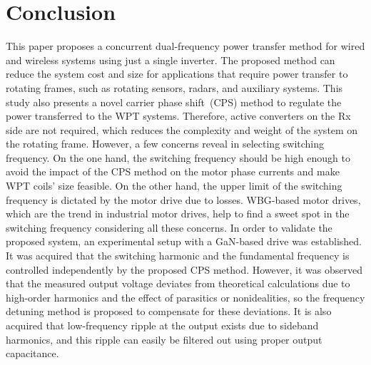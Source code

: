 \documentclass[journal]{IEEEtran}
\begin{document}
\section{Conclusion}
This paper proposes a concurrent dual-frequency power transfer method for wired and wireless systems using just a single inverter.
The proposed method can reduce the system cost and size for applications that require power transfer to rotating frames, such as rotating sensors, radars, and auxiliary systems.
This study also presents a novel carrier phase shift~(CPS) method to regulate the power transferred to the WPT systems.
Therefore, active converters on the Rx side are not required, which reduces the complexity and weight of the system on the rotating frame.
However, a few concerns reveal in selecting switching frequency. 
On the one hand, the switching frequency should be high enough to avoid the impact of the CPS method on the motor phase currents and make WPT coils' size feasible. On the other hand, the upper limit of the switching frequency is dictated by the motor drive due to losses. 
WBG-based motor drives, which are the trend in industrial motor drives,  help to find a sweet spot in the switching frequency considering all these concerns.
In order to validate the proposed system, an experimental setup with a GaN-based drive was established.  
It was acquired that the switching harmonic and the fundamental
frequency is controlled independently by the proposed CPS method.
However, it was observed that the measured output voltage deviates from theoretical calculations due to high-order harmonics and the effect of parasitics or nonidealities, so the frequency detuning method is proposed to compensate for these deviations.
It is also acquired that low-frequency ripple at the output exists due to sideband harmonics, and this ripple can easily be filtered out using proper output capacitance.
\end{document}
